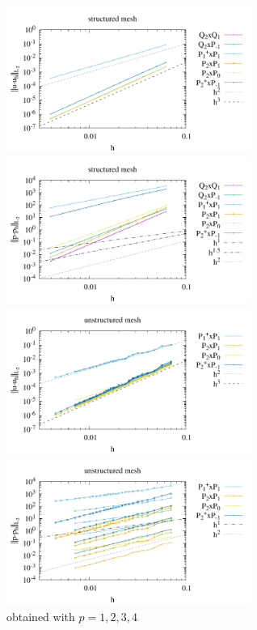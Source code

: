 \begin{center}
\includegraphics[width=8cm]{python_codes/fieldstone_120/paperresults/jokn16_structured_errorsV.pdf}
\includegraphics[width=8cm]{python_codes/fieldstone_120/paperresults/jokn16_structured_errorsP.pdf}\\
\includegraphics[width=8cm]{python_codes/fieldstone_120/paperresults/jokn16_unstructured_errorsV.pdf}
\includegraphics[width=8cm]{python_codes/fieldstone_120/paperresults/jokn16_unstructured_errorsP.pdf}\\
{\captionfont obtained with $p=1,2,3,4$}
\end{center}


